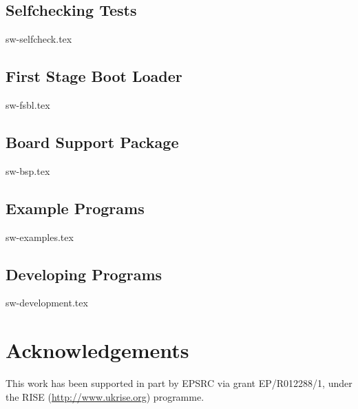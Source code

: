 \documentclass{scarv-report}
\begin{document}
\subsection{Selfchecking Tests}
{sw-selfcheck.tex}

\subsection{First Stage Boot Loader}
\label{sec:sw:fsbl}
{sw-fsbl.tex}

\subsection{Board Support Package}
\label{sec:sw:bsp}
{sw-bsp.tex}

\subsection{Example Programs}
{sw-examples.tex}

\subsection{Developing Programs}
{sw-development.tex}

\section{Acknowledgements}

This work has been supported in part by EPSRC via grant EP/R012288/1,
under the RISE (\url{http://www.ukrise.org}) programme.


\MKEPILOGUE

\end{document}
